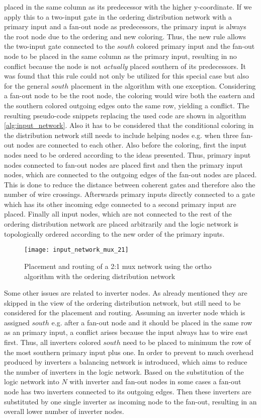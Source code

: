 placed in the same column as its predecessor with the higher y-coordinate. If we apply this to a two-input gate in the ordering distribution network with a primary input and a fan-out node as predecessors, the primary input is always the root node due to the ordering and new coloring. Thus, the new rule allows the two-input gate connected to the $south$ colored primary input and the fan-out node to be placed in the same column as the primary input, resulting in no conflict because the node is not \textit{actually} placed southern of its predecessors. It was found that this rule could not only be utilized for this special case but also for the general $south$ placement in the algorithm with one exception. Considering a fan-out node to be the root node, the coloring would wire both the eastern and the southern colored outgoing edges onto the same row, yielding a conflict. The resulting pseudo-code snippets replacing the used code are shown in algorithm \ref{alg:input_network}. Also it has to be considered that the conditional coloring in the distribution network still needs to include helping nodes e.g. when three fan-out nodes are connected to each other. Also before the coloring, first the input nodes need to be ordered according to the ideas presented. Thus, primary input nodes connected to fan-out nodes are placed first and then the primary input nodes, which are connected to the outgoing edges of the fan-out nodes are placed. This is done to reduce the distance between coherent gates and therefore also the number of wire crossings. Afterwards primary inputs directly connected to a gate which has its other incoming edge connected to a second primary input are placed. Finally all input nodes, which are not connected to the rest of the ordering distribution network are placed arbitrarily and the logic network is topologically ordered according to the new order of the primary inputs.
\begin{figure}
	\centering
	\texttt{[image: input\_network\_mux\_21]}
	\caption{Placement and routing of a 2:1 mux network using the ortho algorithm with the ordering distribution network}\label{fig:input_network_mux_21}
\end{figure}
Some other issues are related to inverter nodes. As already mentioned they are skipped in the view of the ordering distribution network, but still need to be considered for the placement and routing. Assuming an inverter node which is assigned $south$ e.g. after a fan-out node and it should be placed in the same row as an primary input, a conflict arises because the input always has to wire east first. Thus, all inverters colored $south$ need to be placed to minimum the row of the most southern primary input plus one. In order to prevent to much overhead produced by inverters a balancing network is introduced, which aims to reduce the number of inverters in the logic network. Based on the substitution of the logic network into $N$ with inverter and fan-out nodes in some cases a fan-out node has two inverters connected to its outgoing edges. Then these inverters are substituted by one single inverter as incoming node to the fan-out, resulting in an overall lower number of inverter nodes.
